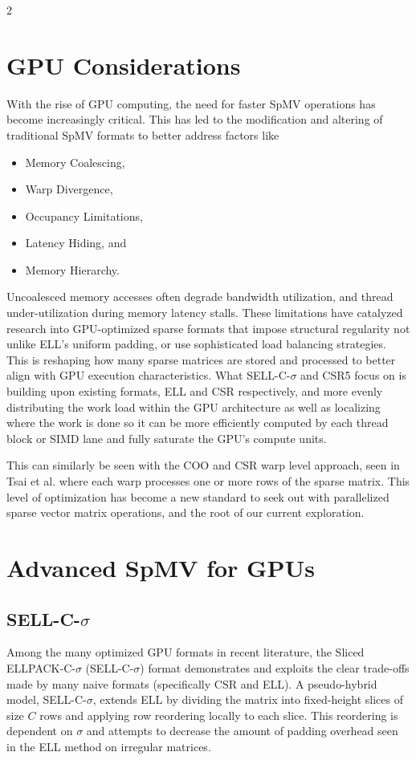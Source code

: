 \documentclass{article}
\begin{document}
\begin{multicols}{2}
\section{GPU Considerations}

With the rise of GPU computing, the need for faster SpMV operations has become increasingly critical. This has led to the modification and altering of traditional SpMV formats to better address factors like
\begin{itemize}
\item Memory Coalescing, 
\item Warp Divergence, 
\item Occupancy Limitations, 
\item Latency Hiding, and
\item Memory Hierarchy.
\end{itemize}


Uncoalesced memory accesses often degrade bandwidth utilization, and thread under-utilization during memory latency stalls. These limitations have catalyzed research into GPU-optimized sparse formats that impose structural regularity not unlike ELL's uniform padding, or use sophisticated load balancing strategies. This is reshaping how many sparse matrices are stored and processed to better align with GPU execution characteristics.  What SELL-C-$\sigma$ and CSR5 focus on is building upon existing formats, ELL and CSR respectively, and more evenly distributing the work load within the GPU architecture as well as localizing where the work is done so it can be more efficiently computed by each thread block or SIMD lane and fully saturate the GPU's compute units.

This can similarly be seen with the COO and CSR warp level approach, seen in Tsai et al. \cite{Tsai2021Race} where each warp processes one or more rows of the sparse matrix. This level of optimization has become a new standard to seek out with parallelized sparse vector matrix operations, and the root of our current exploration.


\section{Advanced SpMV for GPUs}
\subsection{SELL-C-$\sigma$}

Among the many optimized GPU formats in recent literature, the Sliced ELLPACK-C-$\sigma$ (SELL-C-$\sigma$) format demonstrates and exploits the clear trade-offs made by many naive formats (specifically CSR and ELL). A pseudo-hybrid model, SELL-C-$\sigma$, extends ELL by dividing the matrix into fixed-height slices of size $C$ rows and applying row reordering locally to each slice. This reordering is dependent on $\sigma$ and attempts to decrease the amount of padding overhead seen in the ELL method on irregular matrices.


\end{multicols}
\end{document}
